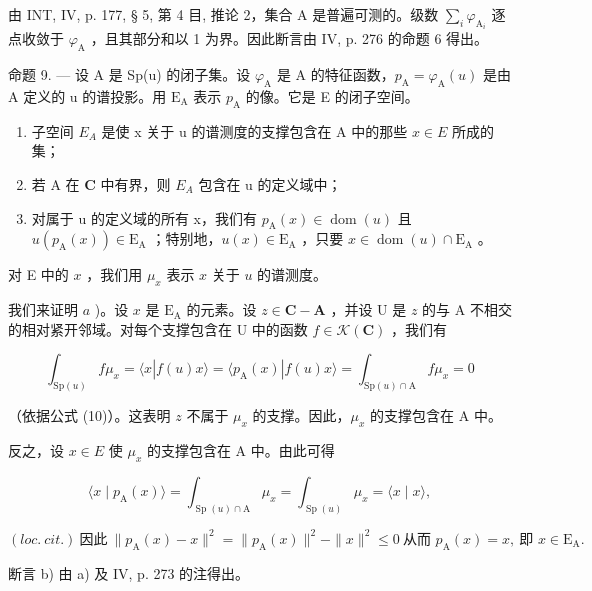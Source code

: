 由 INT, IV, p. 177, § 5, 第 4 目, 推论 2，集合 A 是普遍可测的。级数 \(\sum_{i} \varphi_{\mathrm{A}_{i}}\) 逐点收敛于 \(\varphi_{\mathrm{A}}\) ，且其部分和以 1 为界。因此断言由 IV, p. 276 的命题 6 得出。

命题 9. --- 设 A 是 Sp(u) 的闭子集。设 \(\varphi_{\mathrm{A}}\) 是 A 的特征函数，\(p_{\mathrm{A}} = \varphi_{\mathrm{A}}(u)\) 是由 A 定义的 u 的谱投影。用 \(\mathrm{E}_{\mathrm{A}}\) 表示 \(p_{\mathrm{A}}\) 的像。它是 E 的闭子空间。

\begin{enumerate}
\def\labelenumi{\alph{enumi})}
\item
  子空间 \(E_{A}\) 是使 x 关于 u 的谱测度的支撑包含在 A 中的那些 \(x \in E\) 所成的集；
\item
  若 A 在 \(\mathbf C\) 中有界，则 \(E_{A}\) 包含在 u 的定义域中；
\item
  对属于 u 的定义域的所有 x，我们有 \(p_{\mathrm{A}}(x) \in \operatorname{dom}(u)\) 且 \(u(p_{\mathrm{A}}(x)) \in \mathrm{E}_{\mathrm{A}}\) ；特别地，\(u(x) \in \mathrm{E}_{\mathrm{A}}\) ，只要 \(x \in \operatorname{dom}(u) \cap \mathrm{E}_{\mathrm{A}}\) 。
\end{enumerate}

对 E 中的 \(x\) ，我们用 \(\mu_x\) 表示 \(x\) 关于 \(u\) 的谱测度。

我们来证明 \(a\) )。设 \(x\) 是 \(\mathrm{E}_{\mathrm{A}}\) 的元素。设 \(z \in \mathbf{C} - \mathbf{A}\) ，并设 U 是 \(z\) 的与 A 不相交的相对紧开邻域。对每个支撑包含在 U 中的函数 \(f \in \mathcal{K}(\mathbf{C})\) ，我们有

\[
\int_ {\mathrm{Sp} (u)} f \mu_ {x} = \langle x | f (u) x \rangle = \langle p _ {\mathrm{A}} (x) | f (u) x \rangle = \int_ {\mathrm{Sp} (u) \cap \mathrm{A}} f \mu_ {x} = 0
\]

（依据公式 (10)）。这表明 \(z\) 不属于 \(\mu_x\) 的支撑。因此，\(\mu_x\) 的支撑包含在 A 中。

反之，设 \(x \in E\) 使 \(\mu_{x}\) 的支撑包含在 A 中。由此可得

\[
\langle x \mid p _ {\mathrm{A}} (x) \rangle = \int_ {\operatorname{Sp} (u) \cap \mathrm{A}} \mu_ {x} = \int_ {\operatorname{Sp} (u)} \mu_ {x} = \langle x \mid x \rangle ,
\]

\((loc. \ cit.) \ \text{因此} \ \|p_{\mathrm{A}}(x)-x\|^{2} = \|p_{\mathrm{A}}(x)\|^{2} - \|x\|^{2} \leqslant 0 \ \text{从而 } p_{\mathrm{A}}(x) = x, \ \text{即 } x \in \mathrm{E}_{\mathrm{A}}.\)

断言 b) 由 a) 及 IV, p. 273 的注得出。

